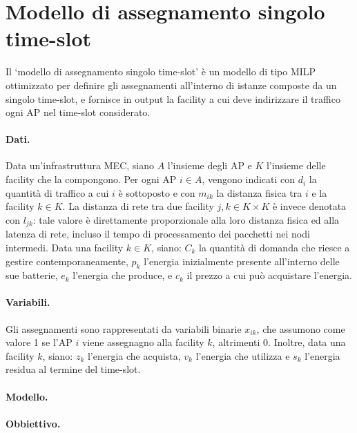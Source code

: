 %
%
\section{Modello di assegnamento singolo time-slot}
\label{sec:modello-singolo-slot}

Il `modello di assegnamento singolo time-slot' è un modello di tipo MILP ottimizzato per definire gli assegnamenti all'interno di istanze composte da un singolo time-slot, e fornisce in output la facility a cui deve indirizzare il traffico ogni AP nel time-slot considerato.

\paragraph*{Dati.}

Data un'infrastruttura MEC, siano $A$ l'insieme degli AP e $K$ l'insieme delle facility che la compongono. Per ogni AP $i \in A$, vengono indicati con $d_i$ la quantità di traffico a cui $i$ è sottoposto e con $m_{ik}$ la distanza fisica tra $i$ e la facility $k \in K$. La distanza di rete tra due facility $j, k \in K \times K$ è invece denotata con $l_{jk}$: tale valore è direttamente proporzionale alla loro distanza fisica ed alla latenza di rete, incluso il tempo di processamento dei pacchetti nei nodi intermedi. Data una facility $k \in K$, siano: $C_k$ la quantità di domanda che riesce a gestire contemporaneamente, $p_k$ l'energia inizialmente presente all'interno delle sue batterie, $e_k$ l'energia che produce, e $c_k$ il prezzo a cui può acquistare l'energia.

\paragraph*{Variabili.}

Gli assegnamenti sono rappresentati da variabili binarie $x_{ik}$, che assumono come valore 1 se l'AP $i$ viene assegnagno alla facility $k$, altrimenti 0. Inoltre, data una facility $k$, siano: $z_k$ l'energia che acquista, $v_k$ l'energia che utilizza e $s_k$ l'energia residua al termine del time-slot.

\paragraph*{Modello.}



\paragraph*{Obbiettivo.}

